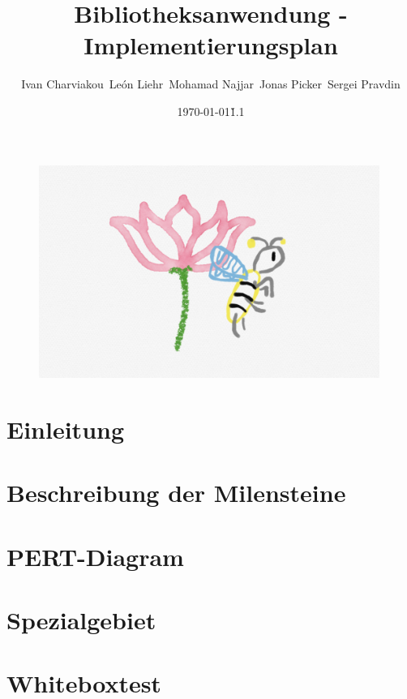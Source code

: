 \documentclass{article}
\title{Bibliotheksanwendung - Implementierungsplan}
\date{\today\v1.1}
\author{
    Ivan Charviakou\
    León Liehr\
    Mohamad Najjar\
    Jonas Picker\
    Sergei Pravdin
}
\begin{document}
    \maketitle
    \begin{figure}[H]
        \centering
        \includegraphics[width = 30em]{Logo}
    \end{figure}
    \newpage
    \tableofcontents
    \newpage


    \section{Einleitung}
    \newpage

    \section{Beschreibung der Milensteine}
    \newpage
    \section{PERT-Diagram}
    \newpage

    \newpage
    \section{Spezialgebiet}
    \newpage

    \section{Whiteboxtest}
    \newpage
\end{document}
